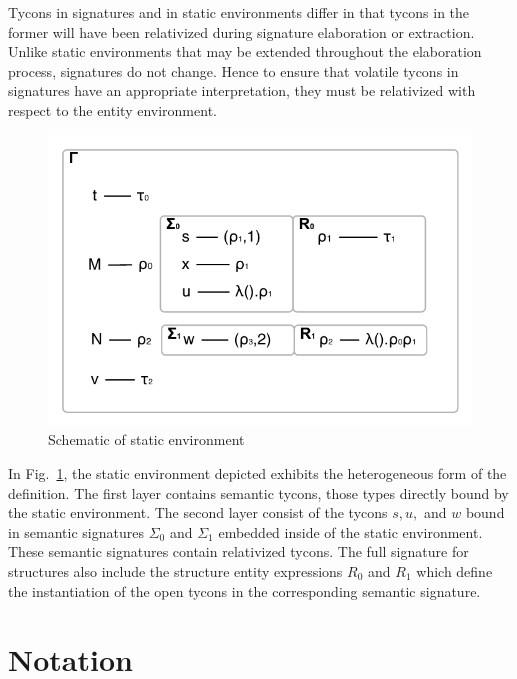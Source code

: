 \documentclass[9pt,nocopyrightspace, fleqn]{sigplanconf}
\begin{document}
Tycons in signatures and in static environments differ in that tycons
in the former will have been relativized during signature elaboration
or extraction. Unlike static environments that may be extended
throughout the elaboration process, signatures do not change. Hence to
ensure that volatile tycons in signatures have an appropriate
interpretation, they must be relativized with respect to the entity
environment. 

\begin{figure}
\begin{center}
\includegraphics[scale=0.5]{../dissertation/figs/fig-staticenv-sigs}
\end{center}
\caption{Schematic of static environment}
\label{fig:staticenv-sigs}
\end{figure}

In Fig.~\ref{fig:staticenv-sigs}, the static environment depicted
exhibits the heterogeneous form of the definition. The first layer
contains semantic tycons, those types directly bound by the static
environment. The second layer consist of the tycons $s, u,$ and $w$ bound in semantic
signatures $\Sigma_0$ and $\Sigma_1$ embedded inside of the static
environment. These semantic signatures contain relativized tycons. The
full signature for structures also include the structure entity
expressions $R_0$ and $R_1$ which define the instantiation of the open
tycons in the corresponding semantic signature.  


\section{Notation}\label{sec:elabnotation}
\end{document}
